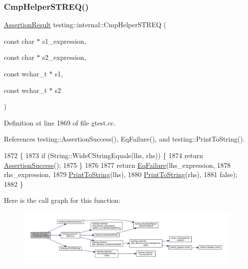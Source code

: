 \subsubsection{\texorpdfstring{Cmp\+Helper\+S\+T\+R\+E\+Q()}{CmpHelperSTREQ()}\hspace{0.1cm}{\footnotesize\ttfamily [2/2]}}
{\footnotesize\ttfamily \hyperlink{classtesting_1_1AssertionResult}{Assertion\+Result} testing\+::internal\+::\+Cmp\+Helper\+S\+T\+R\+EQ (\begin{DoxyParamCaption}\item[{const char $\ast$}]{s1\+\_\+expression,  }\item[{const char $\ast$}]{s2\+\_\+expression,  }\item[{const wchar\+\_\+t $\ast$}]{s1,  }\item[{const wchar\+\_\+t $\ast$}]{s2 }\end{DoxyParamCaption})}



Definition at line 1869 of file gtest.\+cc.



References testing\+::\+Assertion\+Success(), Eq\+Failure(), and testing\+::\+Print\+To\+String().


\begin{DoxyCode}
1872                                                    \{
1873   \textcolor{keywordflow}{if} (String::WideCStringEquals(lhs, rhs)) \{
1874     \textcolor{keywordflow}{return} \hyperlink{namespacetesting_ac1d0baedb17286c5c6c87bd1a45da8ac}{AssertionSuccess}();
1875   \}
1876 
1877   \textcolor{keywordflow}{return} \hyperlink{namespacetesting_1_1internal_a08725846ff184d3e79bcf5be4df19157}{EqFailure}(lhs\_expression,
1878                    rhs\_expression,
1879                    \hyperlink{namespacetesting_aa5717bb1144edd1d262d310ba70c82ed}{PrintToString}(lhs),
1880                    \hyperlink{namespacetesting_aa5717bb1144edd1d262d310ba70c82ed}{PrintToString}(rhs),
1881                    \textcolor{keyword}{false});
1882 \}
\end{DoxyCode}
Here is the call graph for this function\+:
\nopagebreak
\begin{figure}[H]
\begin{center}
\leavevmode
\includegraphics[width=350pt]{namespacetesting_1_1internal_ad351878f87634853c4eb005fe9b169a8_cgraph}
\end{center}
\end{figure}
\mbox{\label{namespacetesting_1_1internal_af2d31c77ce73e1003a64bd7ca3564bbe}} 
